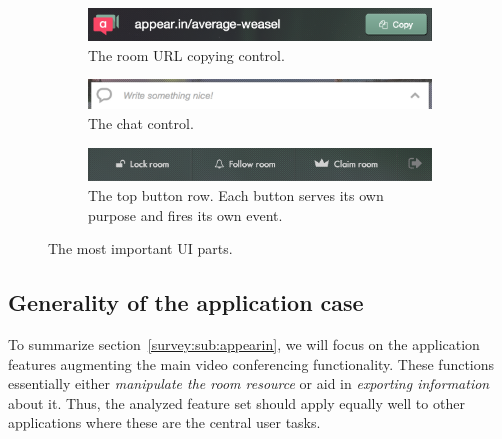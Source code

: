 \begin{figure}[b]
  \centering
  \begin{subfigure}[t]{0.8\textwidth}
    \includegraphics[width=\textwidth]{Figures/screenshots/appearin/feature-copy}
    \caption{The room URL copying control.}
    \label{fig:ui:copy_control}
  \end{subfigure}

  \vspace{.5cm}

  \begin{subfigure}[t]{0.95\textwidth}
    \includegraphics[width=\textwidth]{Figures/screenshots/appearin/feature-chat}
    \caption{The chat control.}
    \label{fig:ui:chat}
  \end{subfigure}

  \vspace{.5cm}

  \begin{subfigure}[t]{0.95\textwidth}
    \includegraphics[width=\textwidth]{Figures/screenshots/appearin/feature-buttons-top}
    \caption{The top button row. Each button serves its own purpose and fires its own event.}
    \label{fig:ui:top_buttons}
  \end{subfigure}

  \caption{The most important UI parts.}
  \label{fig:important_ui_parts}
\end{figure}

\subsection{Generality of the application case}
\label{survey:sub:generality}

To summarize section~\ref{survey:sub:appearin}, we will focus on the application features augmenting the main video conferencing functionality. These functions essentially either \emph{manipulate the room resource} or aid in \emph{exporting information} about it. Thus, the analyzed feature set should apply equally well to other applications where these are the central user tasks.

